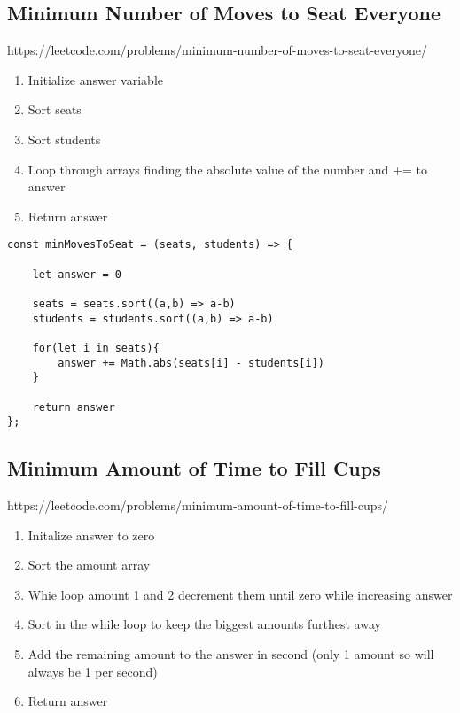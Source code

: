 \documentclass[10pt]{article}
\begin{document}
\pagebreak %
\medskip 
\subsection{Minimum Number of Moves to Seat Everyone}
https://leetcode.com/problems/minimum-number-of-moves-to-seat-everyone/

\begin{enumerate}
	\item Initialize answer variable
	\item Sort seats
	\item Sort students
	\item Loop through arrays finding the absolute value of the number and += to answer
	\item Return answer
\end{enumerate}



\begin{lstlisting}[title=Solution minMovesToSeat, captionpos=t]
const minMovesToSeat = (seats, students) => {
    
    let answer = 0
    
    seats = seats.sort((a,b) => a-b)
    students = students.sort((a,b) => a-b)
    
    for(let i in seats){
        answer += Math.abs(seats[i] - students[i])
    }
    
    return answer
};
\end{lstlisting}
\medskip %






\pagebreak %
\medskip 
\subsection{Minimum Amount of Time to Fill Cups}
https://leetcode.com/problems/minimum-amount-of-time-to-fill-cups/

\begin{enumerate}
	\item Initalize answer to zero
	\item Sort the amount array 
	\item Whie loop amount 1 and 2 decrement them until zero while increasing answer
	\item Sort in the while loop to keep the biggest amounts furthest away 
	\item Add the remaining amount to the answer in second (only 1 amount so will always be 1 per second)
	\item Return answer
\end{enumerate}
\end{document}
